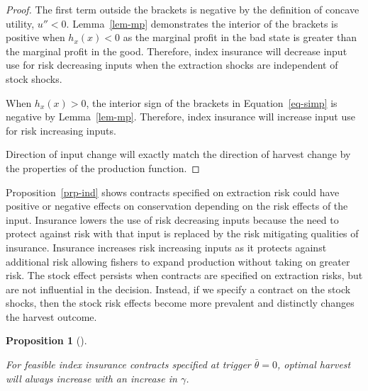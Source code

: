 \documentclass[
  letterpaper,
  DIV=11,
  numbers=noendperiod]{scrartcl}
\theoremstyle{plain}
\theoremstyle{plain}
\newtheorem{proposition}{Proposition}[section]
\theoremstyle{remark}
\begin{document}
\begin{proof}
The first term outside the brackets is negative by the definition of
concave utility, \(u''<0\). Lemma~\ref{lem-mp} demonstrates the interior
of the brackets is positive when \(h_x(x)<0\) as the marginal profit in
the bad state is greater than the marginal profit in the good.
Therefore, index insurance will decrease input use for risk decreasing
inputs when the extraction shocks are independent of stock shocks.

When \(h_x(x)>0\), the interior sign of the brackets in
Equation~\ref{eq-simp} is negative by Lemma~\ref{lem-mp}. Therefore,
index insurance will increase input use for risk increasing inputs.

Direction of input change will exactly match the direction of harvest
change by the properties of the production function.
\end{proof}

Proposition~\ref{prp-ind} shows contracts specified on extraction risk
could have positive or negative effects on conservation depending on the
risk effects of the input. Insurance lowers the use of risk decreasing
inputs because the need to protect against risk with that input is
replaced by the risk mitigating qualities of insurance. Insurance
increases risk increasing inputs as it protects against additional risk
allowing fishers to expand production without taking on greater risk.
The stock effect persists when contracts are specified on extraction
risks, but are not influential in the decision. Instead, if we specify a
contract on the stock shocks, then the stock risk effects become more
prevalent and distinctly changes the harvest outcome.

\begin{proposition}[]\protect\hypertarget{prp-theta}{}\label{prp-theta}

For feasible index insurance contracts specified at trigger
\(\bar\theta=0\), optimal harvest will always increase with an increase
in \(\gamma\).

\end{proposition}
\end{document}
